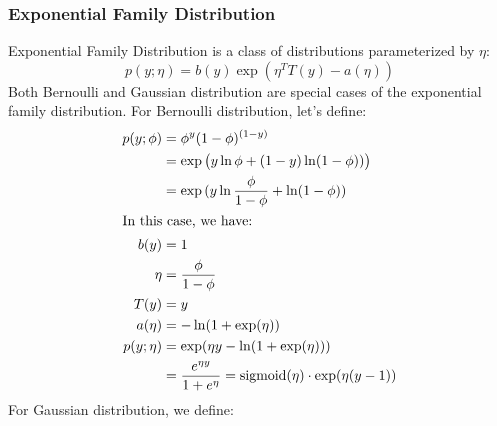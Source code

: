 \documentclass{article}
\begin{document}
\subsubsection{Exponential Family Distribution}
Exponential Family Distribution is a class of distributions parameterized by $\eta$:
$$p(y;\eta) = b(y) \exp (\eta^T T(y) - a(\eta))$$\newline
Both Bernoulli and Gaussian distribution are special cases of the exponential family distribution. For Bernoulli distribution, let's define:
\begin{align*}
    p(y;\phi) &= \phi^y (1 - \phi)^{(1-y)} \\ 
    &= \exp{\left( y \ln \phi + (1-y) \ln (1 - \phi) ) \right)} \\ 
    &= \exp{( y \ln \frac{\phi}{1 - \phi} + \ln(1 - \phi) )} \\ 
    \intertext{In this case, we have:}
    b(y) &= 1 \\
    \eta &= \frac{\phi}{1 - \phi} \\
    T(y) &= y \\  
    a(\eta) &= -\ln (1 + \exp (\eta)) \\ 
    p(y;\eta) &= \exp (\eta y - \ln (1 + \exp (\eta) ) ) \\
    &= \frac{e^{\eta y}}{1 + e^\eta} = \text{sigmoid}(\eta) \cdot \exp (\eta (y-1))
\end{align*}
For Gaussian distribution, we define:
\end{document}
